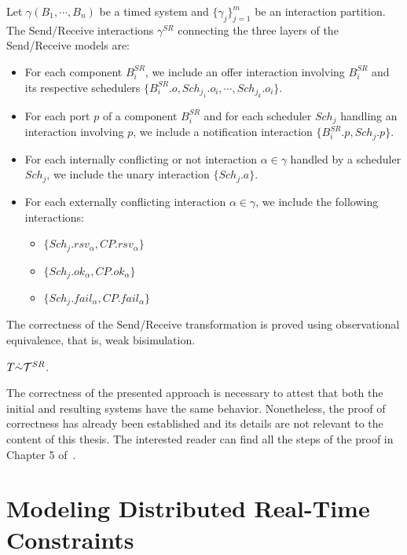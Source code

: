 \begin{definition}
  Let $\gamma(B_1,\cdots,B_n)$ be a timed system and $\{\gamma_j\}^m_{j=1}$ be an interaction
  partition. The Send/Receive interactions $\gamma^{SR}$ connecting the three layers of the
  Send/Receive models are:
  \begin{itemize}
    \item For each component $B_i^{SR}$, we include an offer interaction involving $B_i^{SR}$
      and its respective schedulers $\{B_i^{SR}.o,Sch_{j_1}.o_i,\cdots,Sch_{j_k}.o_i\}$.
    \item For each port $p$ of a component $B_i^{SR}$ and for each scheduler $Sch_j$ handling
      an interaction involving $p$, we include a notification interaction 
      $\{B_i^{SR}.p,Sch_{j}.p\}$.
    \item For each internally conflicting or not interaction $\alpha\in\gamma$ handled by 
      a scheduler $Sch_j$, we include the unary interaction $\{Sch_j.a\}$.
    \item For each externally conflicting interaction $\alpha\in\gamma$, we include the following
      interactions:
      \begin{itemize}
        \item $\{Sch_j.rsv_{\alpha},CP.rsv_{\alpha}\}$
        \item $\{Sch_j.ok_{\alpha},CP.ok_{\alpha}\}$
        \item $\{Sch_j.fail_{\alpha},CP.fail_{\alpha}\}$
      \end{itemize}
  \end{itemize}
\end{definition}

The correctness of the Send/Receive transformation is proved using observational equivalence, 
that is, weak bisimulation. 
\begin{theorem}
  $T\dot{\sim}\mathcal{T}^{SR}$.
\end{theorem}
The correctness of the presented approach is necessary to attest that both the initial
and resulting systems have the same behavior. Nonetheless, the proof of correctness has
already been established and its details are not relevant to the content of this thesis.
The interested reader can find all the steps of the proof in Chapter 5 of~\cite{ahlem_these}.
\section{Modeling Distributed Real-Time Constraints}

